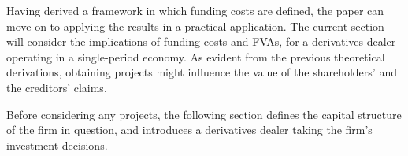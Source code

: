 \documentclass[main.tex]{subfiles}
\begin{document}
    Having derived a framework in which funding costs are defined, 
    the paper can move on to applying the results in a practical application.
    The current section will consider the implications of funding costs and FVAs,
    for a derivatives dealer operating in a single-period economy.
    As evident from the previous theoretical derivations, 
    obtaining projects might influence the value of the shareholders' and the creditors' claims.

    Before considering any projects, 
    the following section defines the capital structure of the firm in question,
    and introduces a derivatives dealer taking the firm's investment decisions. 
\end{document}
